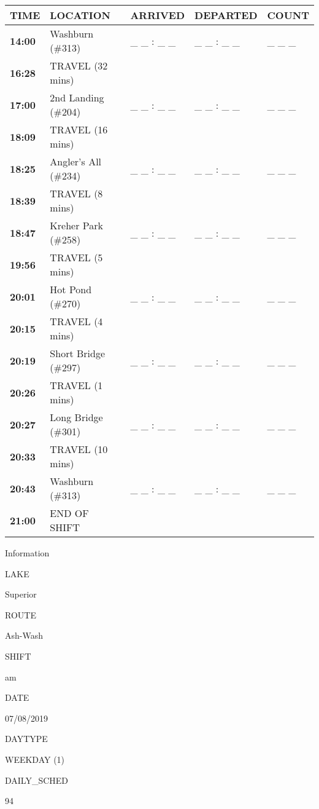 \documentclass[]{article}
\begin{document}
\begin{tabular}{>{\bfseries}lllll}
\toprule
\textbf{TIME} & \textbf{LOCATION} & \textbf{ARRIVED} & \textbf{DEPARTED} & \textbf{COUNT}\\
\midrule
14:00 & Washburn (\#313) & \_ \_ : \_ \_ & \_ \_ : \_ \_ & \_ \_ \_\\
16:28 & TRAVEL (32 mins) &  &  & \\
17:00 & 2nd Landing (\#204) & \_ \_ : \_ \_ & \_ \_ : \_ \_ & \_ \_ \_\\
18:09 & TRAVEL (16 mins) &  &  & \\
18:25 & Angler's All (\#234) & \_ \_ : \_ \_ & \_ \_ : \_ \_ & \_ \_ \_\\
18:39 & TRAVEL (8 mins) &  &  & \\
18:47 & Kreher Park (\#258) & \_ \_ : \_ \_ & \_ \_ : \_ \_ & \_ \_ \_\\
19:56 & TRAVEL (5 mins) &  &  & \\
20:01 & Hot Pond (\#270) & \_ \_ : \_ \_ & \_ \_ : \_ \_ & \_ \_ \_\\
20:15 & TRAVEL (4 mins) &  &  & \\
20:19 & Short Bridge (\#297) & \_ \_ : \_ \_ & \_ \_ : \_ \_ & \_ \_ \_\\
20:26 & TRAVEL (1 mins) &  &  & \\
20:27 & Long Bridge (\#301) & \_ \_ : \_ \_ & \_ \_ : \_ \_ & \_ \_ \_\\
20:33 & TRAVEL (10 mins) &  &  & \\
20:43 & Washburn (\#313) & \_ \_ : \_ \_ & \_ \_ : \_ \_ & \_ \_ \_\\
21:00 & END OF SHIFT &  &  & \\
\bottomrule
\end{tabular}\newpage

Information

LAKE

Superior

ROUTE

Ash-Wash

SHIFT

am

DATE

07/08/2019

DAYTYPE

WEEKDAY (1)

DAILY\_SCHED

94

\vspace{24pt}
\end{document}
